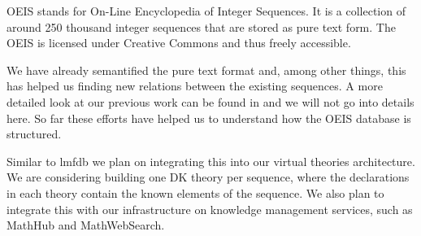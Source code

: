 OEIS \cite{oeis} stands for On-Line Encyclopedia of Integer Sequences. It is a collection
of around 250 thousand integer sequences that are stored as pure text form. The OEIS is
licensed under Creative Commons and thus freely accessible.

We have already semantified the pure text format and, among other things, this has helped
us finding new relations between the existing sequences. A more detailed look at our
previous work can be found in \cite{LuzKoh:fsarfo16} and we will not go into details
here. So far these efforts have helped us to understand how the OEIS database is
structured.

Similar to lmfdb we plan on integrating this into our virtual theories architecture. We
are considering building one DK theory per sequence, where the declarations in each theory
contain the known elements of the sequence. We also plan to integrate this with our
infrastructure on knowledge management services, such as MathHub and MathWebSearch.




